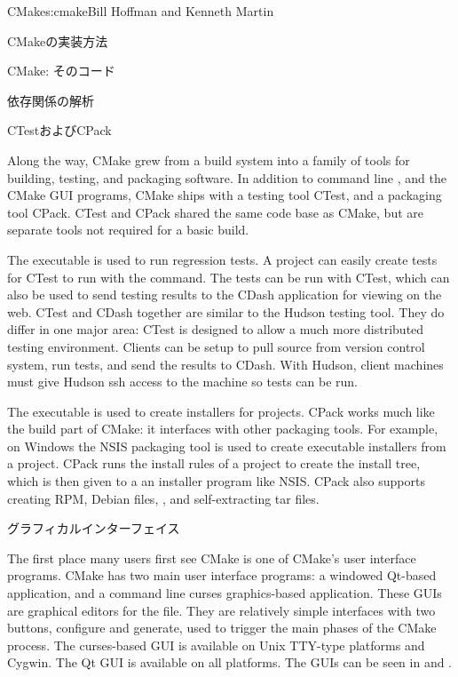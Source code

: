 \begin{aosachapter}{CMake}{s:cmake}{Bill Hoffman and Kenneth Martin}
\begin{aosasect1}{CMakeの実装方法}
\begin{aosasect2}{CMake: そのコード}
\begin{aosasect3}{依存関係の解析}
\end{aosasect3}

\begin{aosasect3}{CTestおよびCPack}

Along the way, CMake grew from a build system into
a family of tools for building, testing, and packaging
software. In addition to command line , and the CMake GUI
programs, CMake ships with a testing tool CTest, and a packaging tool
CPack. CTest and CPack shared the same code base as CMake, but are
separate tools not required for a basic build.

The  executable is used to run regression tests. A project
can easily create tests for CTest to run with the 
command. The tests can be run with CTest, which can also be used to
send testing results to the CDash application for viewing on the web.
CTest and CDash together are similar to the Hudson testing tool. They
do differ in one major area: CTest is designed to allow a much more
distributed testing environment.  Clients can be setup to pull source
from version control system, run tests, and send the results to
CDash. With Hudson, client machines must give Hudson ssh access to the
machine so tests can be run.

The  executable is used to create installers for
projects. CPack works much like the build part of CMake: it interfaces
with other packaging tools. For example, on Windows the NSIS packaging
tool is used to create executable installers from a project. CPack
runs the install rules of a project to create the install tree, which
is then given to a an installer program like NSIS\@.  CPack also
supports creating RPM, Debian  files, ,
 and self-extracting tar files.

\end{aosasect3}

\end{aosasect2}

\begin{aosasect2}{グラフィカルインターフェイス}

The first place many users first see CMake is one of CMake's user
interface programs. CMake has two main user interface programs:
a windowed Qt-based application, and a command line
curses graphics-based application. These GUIs are
graphical editors for the  file. They are
relatively simple interfaces with two buttons, configure and
generate, used to trigger the main phases of the CMake process. The
curses-based GUI is available on Unix TTY-type platforms and
Cygwin. The Qt GUI is available on all platforms.  The GUIs can be
seen in  and .


\end{aosasect2}
\end{aosasect1}
\end{aosachapter}
